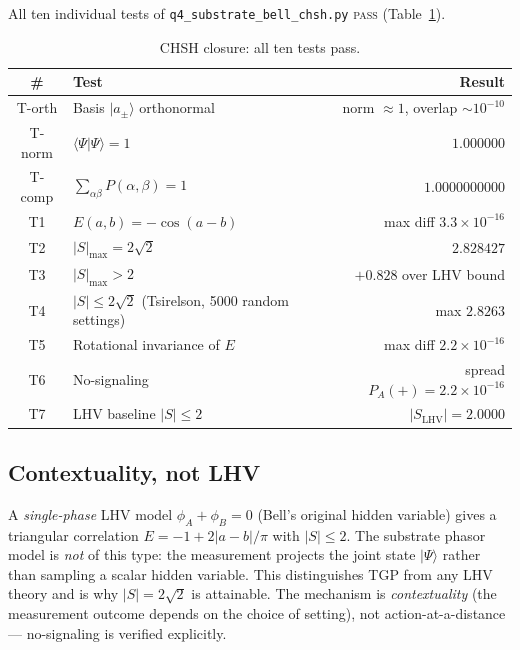 \documentclass[11pt,a4paper]{article}
\begin{document}
All ten individual tests of \verb|q4_substrate_bell_chsh.py|
\textsc{pass} (Table~\ref{tab:chsh}).

\begin{table}[h]
\centering
\caption{CHSH closure: all ten tests pass.}
\label{tab:chsh}
\small
\begin{tabular}{clr}
\toprule
\# & Test & Result \\
\midrule
T-orth & Basis $|a_{\pm}\rangle$ orthonormal
       & norm $\approx 1$, overlap $\sim 10^{-10}$ \\
T-norm & $\langle\Psi|\Psi\rangle=1$
       & $1.000000$ \\
T-comp & $\sum_{\alpha\beta}P(\alpha,\beta)=1$
       & $1.0000000000$ \\
T1     & $E(a,b)=-\cos(a-b)$
       & max diff $3.3\times 10^{-16}$ \\
T2     & $|S|_{\max}=2\sqrt{2}$
       & $2.828427$ \\
T3     & $|S|_{\max}>2$
       & $+0.828$ over LHV bound \\
T4     & $|S|\leq 2\sqrt{2}$ (Tsirelson, 5000 random settings)
       & max $2.8263$ \\
T5     & Rotational invariance of $E$
       & max diff $2.2\times 10^{-16}$ \\
T6     & No-signaling
       & spread $P_{A}(+)=2.2\times 10^{-16}$ \\
T7     & LHV baseline $|S|\leq 2$
       & $|S_{\mathrm{LHV}}|=2.0000$ \\
\bottomrule
\end{tabular}
\end{table}

\subsection{Contextuality, not LHV}

A \emph{single-phase} LHV model $\phi_{A}+\phi_{B}=0$ (Bell's
original hidden variable) gives a triangular correlation
$E=-1+2|a-b|/\pi$ with $|S|\leq 2$. The substrate phasor model is
\emph{not} of this type: the measurement projects the joint state
$|\Psi\rangle$ rather than sampling a scalar hidden variable.
This distinguishes TGP from any LHV theory and is why $|S|=2\sqrt{2}$
is attainable. The mechanism is \emph{contextuality}
(the measurement outcome depends on the choice of setting), not
action-at-a-distance --- no-signaling is verified explicitly.

\end{document}

